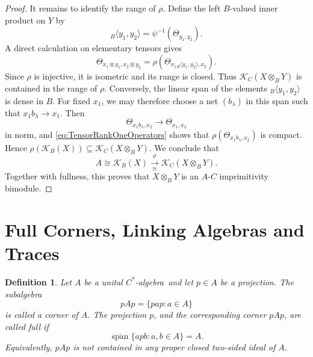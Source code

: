 \documentclass{book}
\newtheorem{definition}{Definition}[section]
\def\cstar{\(C^*\)-algebra}
\begin{document}
\begin{proof}
  It remains to identify the range of \(\rho\). Define the left
  \(B\)-valued inner product on \(Y\) by
  \[
    {}_B\langle y_1,y_2\rangle
    =\psi^{-1}(\Theta_{y_1,y_2}).
  \]
  A direct calculation on elementary tensors gives
  \begin{equation}\label{eq:TensorRankOneOperators}
    \Theta_{x_1\otimes y_1,x_2\otimes y_2}
    =
    \rho\!\left(
      \Theta_{x_1{}_B\langle y_1,y_2\rangle,x_2}
    \right).
  \end{equation}
  Since \(\rho\) is injective, it is isometric and its range is closed.
  Thus \(\mathcal K_C(X\otimes_B Y)\) is contained in the range of \(\rho\).
  Conversely, the linear span of the elements
  \({}_B\langle y_1,y_2\rangle\) is dense in \(B\). For fixed \(x_1\), we may
  therefore choose a net \((b_\lambda)\) in this span such that
  \(x_1b_\lambda\to x_1\). Then
  \[
    \Theta_{x_1b_\lambda,x_2}
      \longrightarrow\Theta_{x_1,x_2}
  \]
  in norm, and \eqref{eq:TensorRankOneOperators} shows that
  \(\rho(\Theta_{x_1b_\lambda,x_2})\) is compact. Hence
  \(\rho(\mathcal K_B(X))\subseteq\mathcal K_C(X\otimes_B Y)\).
  We conclude that
  \[
    A\cong\mathcal K_B(X)
      \xrightarrow[\cong]{\rho}
    \mathcal K_C(X\otimes_B Y).
  \]
  Together with fullness, this proves that \(X\otimes_B Y\) is an
  \(A\)-\(C\) imprimitivity bimodule.
\end{proof}

\section{Full Corners, Linking Algebras and Traces}

\begin{definition}
  Let \(A\) be a unital \cstar\ and let \(p\in A\) be a projection. The
  subalgebra
  \[
    pAp=\{pap:a\in A\}
  \]
  is called a \textnormal{corner} of \(A\). The projection \(p\), and the
  corresponding corner \(pAp\), are called \textnormal{full} if
  \[
    \overline{\operatorname{span}}
    \{apb:a,b\in A\}
    =A.
  \]
  Equivalently, \(pAp\) is not contained in any proper closed two-sided
  ideal of \(A\).
\end{definition}
\end{document}
